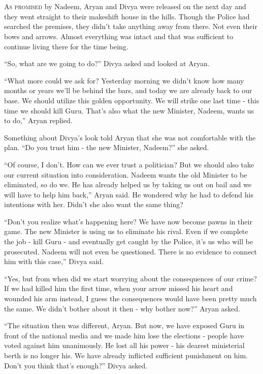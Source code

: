 \chapter{}

\lettrine{A}{s promised} by Nadeem, Aryan and Divya were released on the next day and they
went straight to their makeshift house in the hills. Though the Police had
searched the premises, they didn't take anything away from there. Not even their
bows and arrows. Almost everything was intact and that was sufficient to
continue living there for the time being.

“So, what are we going to do?” Divya asked and looked at Aryan.

“What more could we ask for? Yesterday morning we didn't know how many months or
years we'll be behind the bars, and today we are already back to our base. We
should utilize this golden opportunity. We will strike one last time - this time
we should kill Guru. That's also what the new Minister, Nadeem, wants us to do,”
Aryan replied.

Something about Divya's look told Aryan that she was not comfortable with the
plan. “Do you trust him - the new Minister, Nadeem?” she asked.

“Of course, I don't. How can we ever trust a politician? But we should also take
our current situation into consideration. Nadeem wants the old Minister to be
eliminated, so do we. He has already helped us by taking us out on bail and we
will have to help him back,” Aryan said. He wondered why he had to defend his
intentions with her. Didn't she also want the same thing?

“Don't you realize what's happening here? We have now become pawns in their
game. The new Minister is using us to eliminate his rival. Even if we complete
the job - kill Guru - and eventually get caught by the Police, it's us who will
be prosecuted. Nadeem will not even be questioned. There is no evidence to
connect him with this case,” Divya said.

“Yes, but from when did we start worrying about the consequences of our crime?
If we had killed him the first time, when your arrow missed his heart and
wounded his arm instead, I guess the consequences would have been pretty much
the same. We didn't bother about it then - why bother now?” Aryan asked.

“The situation then was different, Aryan. But now, we have exposed Guru in front
of the national media and we made him lose the elections - people have voted
against him unanimously. He lost all his power - his dearest ministerial berth
is no longer his. We have already inflicted sufficient punishment on him. Don't
you think that's enough?” Divya asked.

